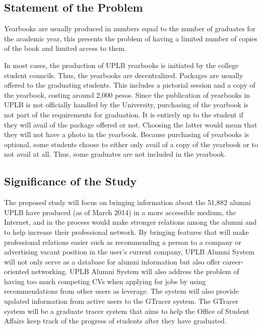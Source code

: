 \documentclass[journal]{./IEEE/IEEEtran}
\begin{document}
\subsection{Statement of the Problem}
Yearbooks are usually produced in numbers equal to the number of graduates for the academic year, this presents the problem of having a limited number of copies of the book and limited access to them. \par

In most cases, the production of UPLB yearbooks is initiated by the college student councils. Thus, the yearbooks are decentralized. Packages are usually offered to the graduating students. This includes a pictorial session and a copy of the yearbook, costing around 2,000 pesos. Since the publication of yearbooks in UPLB is not officially handled by the University, purchasing of the yearbook is not part of the requirements for graduation. It is entirely up to the student if they will avail of the package offered or not. Choosing the latter would mean that they will not have a photo in the yearbook. Because purchasing of yearbooks is optional, some students choose to either only avail of a copy of the yearbook or to not avail at all. Thus, some graduates are not included in the yearbook. \par

\subsection{Significance of the Study}
The proposed study will focus on bringing information about the 51,882 alumni UPLB have produced (as of March 2014) \cite{electronic_oar} in a more accessible medium, the Internet, and in the process would make stronger relations among the alumni and to help increase their professional network. By bringing features that will make professional relations easier such as recommending a person to a company or advertising vacant position in the user's current company, UPLB Alumni System will not only serve as a database for alumni information but also offer career-oriented networking. UPLB Alumni System will also address the problem of having too much competing CVs when applying for jobs by using recommendations from other users as leverage. The system will also provide updated information from active users to the GTracer system. The GTracer system will be a graduate tracer system that aims to help the Office of Student Affairs keep track of the progress of students after they have graduated. \par
\end{document}
